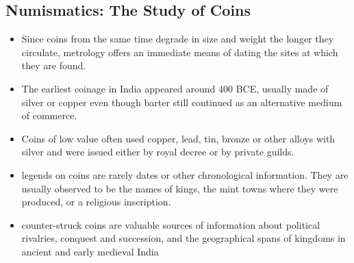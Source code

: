 \subsection{Numismatics: The Study of Coins}
\begin{itemize}
    \item Since coins from the same time degrade in size and weight the longer they circulate, \gls{metrology} offers an immediate means of dating the sites at which they are found.
    \item The earliest \gls{coinage} in India appeared around 400 BCE, usually made of silver or copper even though barter still continued as an alternative medium of commerce.
    \item Coins of low value often used copper, lead, tin, bronze or other alloys with silver and were issued either by royal decree or by private guilds.
    \item \Glspl{legend} on coins are rarely dates or other chronological information. They are usually observed to be the names of kings, the mint towns where they were produced, or a religious inscription.
    \item \Gls{counter-struck} coins are valuable sources of information about political rivalries, conquest and succession, and the geographical spans of kingdoms in ancient and early medieval India
\end{itemize}
